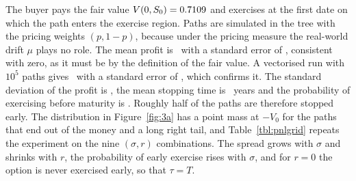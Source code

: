 The buyer pays the fair value $V(0,S_0)=0.7109$ and exercises at the first date on which the path enters the exercise region.
Paths are simulated in the tree with the pricing weights $(p,1-p)$, because under the pricing measure the real-world drift $\mu$ plays no role.
The mean profit is \PnLmean\ with a standard error of \PnLse, consistent with zero, as it must be by the definition of the fair value.
A vectorised run with $10^5$ paths gives \PnLQmean\ with a standard error of \PnLQse, which confirms it.
The standard deviation of the profit is \PnLsd, the mean stopping time is \PnLtau\ years and the probability of exercising before maturity is \PnLpex.
Roughly half of the paths are therefore stopped early.
The distribution in Figure~\ref{fig:3a} has a point mass at $-V_0$ for the paths that end out of the money and a long right tail, and Table~\ref{tbl:pnlgrid} repeats the experiment on the nine $(\sigma,r)$ combinations.
The spread grows with $\sigma$ and shrinks with $r$, the probability of early exercise rises with $\sigma$, and for $r=0$ the option is never exercised early, so that $\tau=T$.
